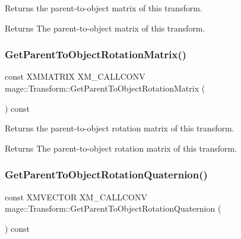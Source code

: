Returns the parent-\/to-\/object matrix of this transform.

\begin{DoxyReturn}{Returns}
The parent-\/to-\/object matrix of this transform. 
\end{DoxyReturn}
\hypertarget{classmage_1_1_transform_a95019381ff6b40edc197743ac93126c6}{}\label{classmage_1_1_transform_a95019381ff6b40edc197743ac93126c6} 
\subsubsection{\texorpdfstring{Get\+Parent\+To\+Object\+Rotation\+Matrix()}{GetParentToObjectRotationMatrix()}}
{\footnotesize\ttfamily const X\+M\+M\+A\+T\+R\+IX X\+M\+\_\+\+C\+A\+L\+L\+C\+O\+NV mage\+::\+Transform\+::\+Get\+Parent\+To\+Object\+Rotation\+Matrix (\begin{DoxyParamCaption}{ }\end{DoxyParamCaption}) const\hspace{0.3cm}{\ttfamily [noexcept]}}

Returns the parent-\/to-\/object rotation matrix of this transform.

\begin{DoxyReturn}{Returns}
The parent-\/to-\/object rotation matrix of this transform. 
\end{DoxyReturn}
\hypertarget{classmage_1_1_transform_adb8a034a1abc3a7d0e2cfd92867596e2}{}\label{classmage_1_1_transform_adb8a034a1abc3a7d0e2cfd92867596e2} 
\subsubsection{\texorpdfstring{Get\+Parent\+To\+Object\+Rotation\+Quaternion()}{GetParentToObjectRotationQuaternion()}}
{\footnotesize\ttfamily const X\+M\+V\+E\+C\+T\+OR X\+M\+\_\+\+C\+A\+L\+L\+C\+O\+NV mage\+::\+Transform\+::\+Get\+Parent\+To\+Object\+Rotation\+Quaternion (\begin{DoxyParamCaption}{ }\end{DoxyParamCaption}) const\hspace{0.3cm}{\ttfamily [noexcept]}}

